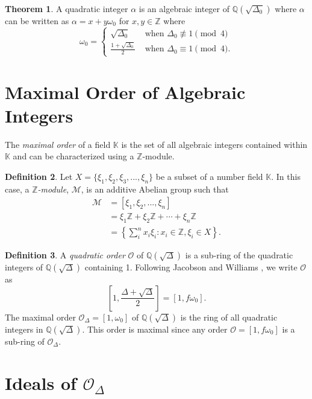 \documentclass{ucalgthes1}
\theoremstyle{definition}
\newtheorem{thm}{Theorem}[section]
\newtheorem{defn}[thm]{Definition}
\newcommand{\KK}{\mathbb{K}}
\newcommand{\MM}{\mathcal{M}}
\newcommand{\OO}{\mathcal{O}}
\newcommand{\ZZ}{\mathbb{Z}}
\newcommand{\QQ}{\mathbb{Q}}
\begin{document}
\begin{thm}
\cite[Theorem 4.10]{Jacobson2009} A quadratic integer $\alpha$ is an algebraic integer of $\QQ(\sqrt{\Delta_0})$ where $\alpha$ can be written as $\alpha = x + y \omega_0$ for $x, y \in \ZZ$ where
\begin{equation*}
	\omega_0 = \begin{cases}
		\sqrt{\Delta_0} & \textrm{ when } \Delta_0 \not\equiv 1 \pmod 4 \\
		\frac{1+\sqrt{\Delta_0}}{2} & \textrm{ when } \Delta_0 \equiv 1 \pmod 4.
	\end{cases}
\end{equation*}
\end{thm}


\section{Maximal Order of Algebraic Integers}

The \emph{maximal order} of a field $\KK$ is the set of all algebraic integers contained within $\KK$ and can be characterized using a $\ZZ$-module.

\begin{defn}
Let $X = \{ \xi_1, \xi_2, \xi_3, ..., \xi_n \}$ be a subset of a number field $\KK$.  In this case, a \emph{$\ZZ$\mbox{-}module}, $\MM$, is an additive Abelian group such that
\begin{align*}
	\MM &= [ \xi_1, \xi_2, ..., \xi_n ] \\
	& =  \xi_1 \ZZ + \xi_2 \ZZ + \cdots + \xi_n \ZZ \\
	& = \left \{ \sum_{i}^n x_i \xi_i : x_i \in \ZZ, \xi_i \in X \right \}.
\end{align*}
\end{defn}

\begin{defn}
A \emph{quadratic order} $\OO$ of $\QQ(\sqrt\Delta)$ is a sub-ring of the quadratic integers of $\QQ(\sqrt\Delta)$ containing 1.  Following Jacobson and Williams \cite[p.81]{Jacobson2009}, we write $\OO$ as
\[
	\left[ 1, \frac{\Delta + \sqrt{\Delta}}{2} \right] = [1, f\omega_0].
\]
The maximal order $\OO_\Delta = [1, \omega_0]$ of $\QQ(\sqrt\Delta)$ is the ring of all quadratic integers in $\QQ(\sqrt\Delta)$.  This order is maximal since any order $\OO = [1, f\omega_0]$ is a sub-ring of $\OO_\Delta$.
\end{defn}


\section{Ideals of $\OO_\Delta$}
\end{document}
